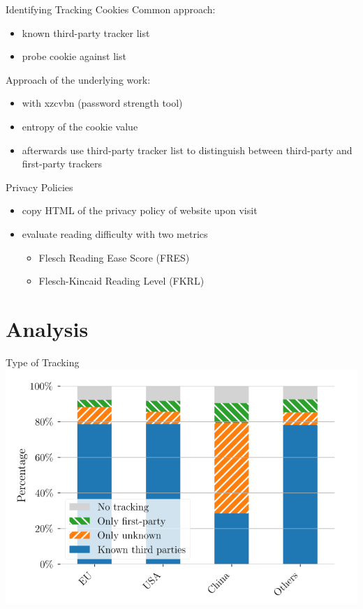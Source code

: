 \documentclass[xcolor={dvipsnames}]{beamer}
\begin{document}
\begin{frame}{Identifying Tracking Cookies}
    Common approach:
    \begin{itemize}
        \item known third-party tracker list
        \item probe cookie against list
    \end{itemize}

    \pause
    \vspace{2em}

    Approach of the underlying work:
    \begin{itemize}
        \item with xzcvbn (password strength tool)
        \item entropy of the cookie value
        \item afterwards use third-party tracker list to distinguish between third-party and first-party trackers
    \end{itemize}
\end{frame}

\begin{frame}{Privacy Policies}
    \begin{itemize}
        \item copy HTML of the privacy policy of website upon visit
        \item evaluate reading difficulty with two metrics
            \begin{itemize}
                \item Flesch Reading Ease Score (FRES)
                \item Flesch-Kincaid Reading Level (FKRL)
        \end{itemize}
    \end{itemize}
\end{frame}

\section{Analysis}

\begin{frame}{Type of Tracking}
    \centering
    \includegraphics[scale=0.36]{figures/tracking_kind_trans.png}
\end{frame}
\end{document}
